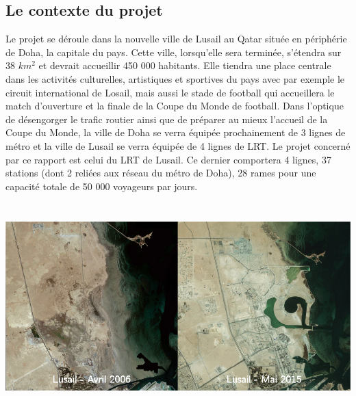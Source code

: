 \subsection{Le contexte du projet} Le projet se déroule dans la nouvelle ville de Lusail au Qatar située en périphérie de Doha, la capitale du pays. Cette ville, lorsqu'elle sera terminée, s'étendra sur 38 \begin{math} km^2 \end{math} et devrait accueillir 450 000 habitants. Elle tiendra une place centrale dans les activités culturelles, artistiques et sportives du pays avec par exemple le circuit international de Losail, mais aussi le stade de football qui accueillera le match d'ouverture et la finale de la Coupe du Monde de football. Dans l'optique de désengorger le trafic routier ainsi que de préparer au mieux l'accueil de la Coupe du Monde, la ville de Doha se verra équipée prochainement de 3 lignes de métro et la ville de Lusail se verra équipée de 4 lignes de LRT. Le projet concerné par ce rapport est celui du LRT de Lusail. Ce dernier comportera 4 lignes, 37 stations (dont 2 reliées aux réseau du métro de Doha), 28 rames pour une capacité totale de 50 000 voyageurs par jours.

\begin{center}
\includegraphics[height=8cm]{ressources/images/figures/Lusail.png}
\end{center}

